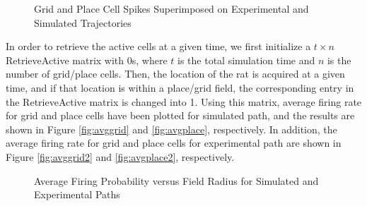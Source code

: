 \documentclass[11pt, letterpaper, onecolumn]{article}
\begin{document}
\begin{figure}[H]
\centering
\caption{Grid and Place Cell Spikes Superimposed on Experimental and Simulated Trajectories}
\label{fig:proj}
\end{figure}

In order to retrieve the active cells at a given time, we first initialize a $ t \times n $ RetrieveActive matrix with $ 0 $s, where $ t $ is the total simulation time and $ n $ is the number of grid/place cells. Then, the location of the rat is acquired at a given time, and if that location is within a place/grid field, the corresponding entry in the RetrieveActive matrix is changed into 1. Using this matrix, average firing rate for grid and place cells have been plotted for simulated path, and the results are shown in Figure \ref{fig:avggrid} and \ref{fig:avgplace}, respectively. In addition, the average firing rate for grid and place cells for experimental path are shown in Figure \ref{fig:avggrid2} and \ref{fig:avgplace2}, respectively.
 
\begin{figure}[H]
\centering
{}
\label{fig:avgfiring}
\caption{Average Firing Probability versus Field Radius for Simulated and Experimental Paths}
\end{figure}
\end{document}
